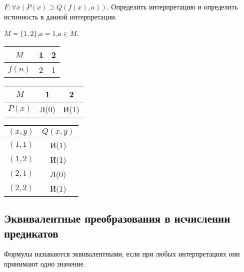 \begin{ex} $F\colon \forall x (P(x) \supset Q(f(x),a))$. Определить
интерпретацию и определить истинность в данной интерпретации.

  $M = \{1,2\}$,\qquad $a = 1$,\quad $a \in M$.

  \begin{center}
    \begin{tabular}{c||c|c|} $M$ & 1 & 2\\ \hline\hline $f(n)$ & 2 &
1\\
    \end{tabular} \qquad
    \begin{tabular}{c||c|c|} $M$ & 1 & 2\\ \hline\hline $P(x)$ & Л(0)
& И(1)\\
    \end{tabular}
  \end{center}
  
  \begin{center}
    \begin{tabular}{c||c|} $(x,y)$ & $Q(x,y)$\\ \hline\hline $(1,1)$ &
И(1)\\ \hline $(1,2)$ & И(1)\\ \hline $(2,1)$ & Л(0)\\ \hline $(2,2)$
& И(1)\\ \hline
    \end{tabular}
  \end{center}
\end{ex}


\subsection{Эквивалентные преобразования в исчислении предикатов}

\begin{defin} Формулы называются эквивалентными, если при любых
интерпретациях они принимают одно значение.
\end{defin}

